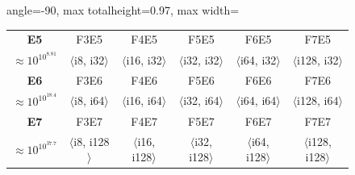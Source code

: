 \documentclass[12pt,letter]{article}
\begin{document}
\begin{figure}[H]
\begin{adjustbox}{angle=-90, max totalheight=0.97\textheight, max width=\textwidth}
\begin{minipage}{0.97\textheight}
\begin{tabular}{|c|c|c|c|c|c|}
        \hline
        \textbf{E5}                      & F3E5                                                                               & F4E5                                & F5E5                                & F6E5                                & F7E5                                 \\
        $\approx 10^{10^{8.81}}$ & $\langle$i8, i32$\rangle$                                                  & $\langle$i16, i32$\rangle$  & $\langle$i32, i32$\rangle$  & $\langle$i64, i32$\rangle$  & $\langle$i128, i32$\rangle$  \\
        \hline
        \textbf{E6}                      & F3E6                                                                               & F4E6                                & F5E6                                & F6E6                                & F7E6                                 \\
        $\approx 10^{10^{18.4}}$ & $\langle$i8, i64$\rangle$                                                  & $\langle$i16, i64$\rangle$  & $\langle$i32, i64$\rangle$  & $\langle$i64, i64$\rangle$  & $\langle$i128, i64$\rangle$  \\
        \hline
        \textbf{E7}                      & F3E7                                                                               & F4E7                                & F5E7                                & F6E7                                & F7E7                                 \\
        $\approx 10^{10^{37.7}}$ & $\langle$i8, i128$\rangle$                                                 & $\langle$i16, i128$\rangle$ & $\langle$i32, i128$\rangle$ & $\langle$i64, i128$\rangle$ & $\langle$i128, i128$\rangle$ \\
        \hline
    \end{tabular}
\end{minipage}
\end{adjustbox}
\end{figure}
\end{document}
